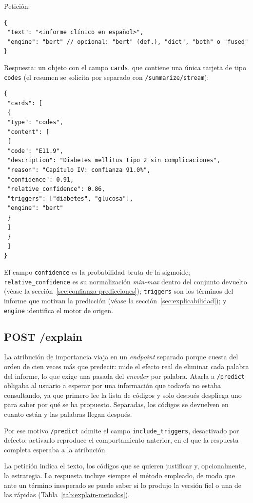 Petición:

{\small
\begin{verbatim}
{
 "text": "<informe clínico en español>",
 "engine": "bert" // opcional: "bert" (def.), "dict", "both" o "fused"
}
\end{verbatim}
}

Respuesta: un objeto con el campo \texttt{cards}, que contiene una única tarjeta de tipo \texttt{codes} (el resumen se solicita por separado con \texttt{/summarize/stream}):

{\small
\begin{verbatim}
{
 "cards": [
 {
 "type": "codes",
 "content": [
 {
 "code": "E11.9",
 "description": "Diabetes mellitus tipo 2 sin complicaciones",
 "reason": "Capítulo IV: confianza 91.0%",
 "confidence": 0.91,
 "relative_confidence": 0.86,
 "triggers": ["diabetes", "glucosa"],
 "engine": "bert"
 }
 ]
 }
 ]
}
\end{verbatim}
}

El campo \texttt{confidence} es la probabilidad bruta de la sigmoide; \texttt{relative\_confidence} es su normalización \emph{min-max} dentro del conjunto devuelto (véase la sección~\ref{sec:confianza-predicciones}); \texttt{triggers} son los términos del informe que motivan la predicción (véase la sección~\ref{sec:explicabilidad}); y \texttt{engine} identifica el motor de origen.

\subsection{POST /explain}

La atribución de importancia viaja en un \emph{endpoint} separado porque cuesta del orden de cien veces más que predecir: mide el efecto real de eliminar cada palabra del informe, lo que exige una pasada del \emph{encoder} por palabra. Atarla a \texttt{/predict} obligaba al usuario a esperar por una información que todavía no estaba consultando, ya que primero lee la lista de códigos y solo después despliega uno para saber por qué se ha propuesto. Separadas, los códigos se devuelven en cuanto están y las palabras llegan después.

Por ese motivo \texttt{/predict} admite el campo \texttt{include\_triggers}, desactivado por defecto: activarlo reproduce el comportamiento anterior, en el que la respuesta completa esperaba a la atribución.

La petición indica el texto, los códigos que se quieren justificar y, opcionalmente, la estrategia. La respuesta incluye siempre el método empleado, de modo que ante un término inesperado se puede saber si lo produjo la versión fiel o una de las rápidas (Tabla~\ref{tab:explain-metodos}).


